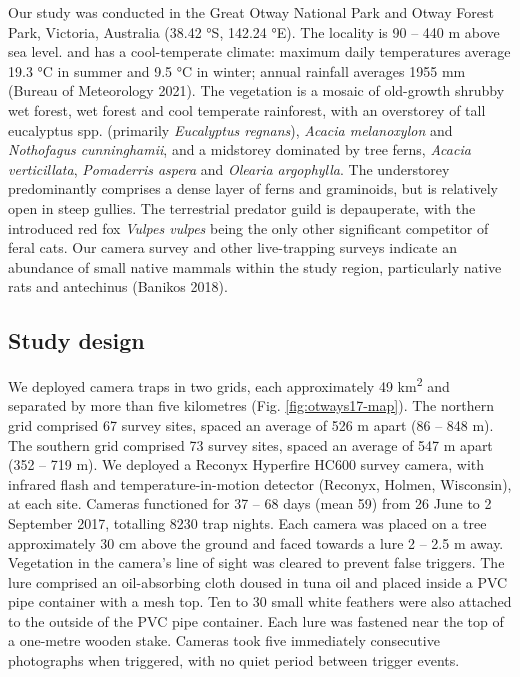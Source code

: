 \documentclass[11pt,a4paper,titlepage,twoside,openright]{style/unimelbthesis}
\begin{document}
\begin{mainmatter}
Our study was conducted in the Great Otway National Park and Otway Forest Park, Victoria, Australia (38.42 °S, 142.24 °E). The locality is 90 -- 440 m above sea level. and has a cool-temperate climate: maximum daily temperatures average 19.3 °C in summer and 9.5 °C in winter; annual rainfall averages 1955 mm (Bureau of Meteorology 2021). The vegetation is a mosaic of old-growth shrubby wet forest, wet forest and cool temperate rainforest, with an overstorey of tall eucalyptus spp. (primarily \emph{Eucalyptus regnans}), \emph{Acacia melanoxylon} and \emph{Nothofagus cunninghamii}, and a midstorey dominated by tree ferns, \emph{Acacia verticillata}, \emph{Pomaderris aspera} and \emph{Olearia argophylla}. The understorey predominantly comprises a dense layer of ferns and graminoids, but is relatively open in steep gullies. The terrestrial predator guild is depauperate, with the introduced red fox \emph{Vulpes vulpes} being the only other significant competitor of feral cats. Our camera survey and other live-trapping surveys indicate an abundance of small native mammals within the study region, particularly native rats and antechinus (Banikos 2018).

\hypertarget{study-design}{%
\subsection{Study design}\label{study-design}}

We deployed camera traps in two grids, each approximately 49 km\textsuperscript{2} and separated by more than five kilometres (Fig. \ref{fig:otways17-map}). The northern grid comprised 67 survey sites, spaced an average of 526 m apart (86 -- 848 m). The southern grid comprised 73 survey sites, spaced an average of 547 m apart (352 -- 719 m). We deployed a Reconyx Hyperfire HC600 survey camera, with infrared flash and temperature-in-motion detector (Reconyx, Holmen, Wisconsin), at each site. Cameras functioned for 37 -- 68 days (mean 59) from 26 June to 2 September 2017, totalling 8230 trap nights. Each camera was placed on a tree approximately 30 cm above the ground and faced towards a lure 2 -- 2.5 m away. Vegetation in the camera's line of sight was cleared to prevent false triggers. The lure comprised an oil-absorbing cloth doused in tuna oil and placed inside a PVC pipe container with a mesh top. Ten to 30 small white feathers were also attached to the outside of the PVC pipe container. Each lure was fastened near the top of a one-metre wooden stake. Cameras took five immediately consecutive photographs when triggered, with no quiet period between trigger events.


\end{mainmatter}
\end{document}

